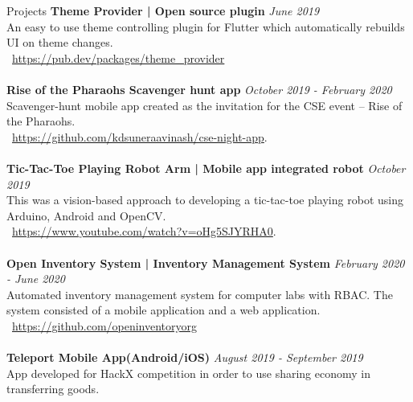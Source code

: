 \documentclass{cv}
\begin{document}
\begin{adjustwidth}{55pt}{0pt}
\begin{rSection}{Projects}
{\bf Theme Provider | Open source plugin}                        \hfill {\em June 2019} 
\\An easy to use theme controlling plugin for Flutter which automatically rebuilds UI on theme changes. \\
\faPlug\ \url{https://pub.dev/packages/theme\_provider} \\
\\{\bf Rise of the Pharaohs Scavenger hunt app}                 \hfill {\em October 2019 - February 2020} 
\\Scavenger-hunt mobile app created as the invitation for the CSE event – Rise of the Pharaohs.\\
\faGithub*\ \url{https://github.com/kdsuneraavinash/cse-night-app}. \\
\\{\bf Tic-Tac-Toe Playing Robot Arm | Mobile app integrated robot}     \hfill {\em October 2019}
\\This was a vision-based approach to developing a tic-tac-toe playing robot using Arduino, Android and OpenCV.\\
\faYoutube\ \url{https://www.youtube.com/watch?v=oHg5SJYRHA0}. \\
\\{\bf Open Inventory System | Inventory Management System}     \hfill {\em February 2020 - June 2020} 
\\Automated inventory management system for computer labs with RBAC. The system consisted of a mobile application and a web application.\\
\faGithub\ \url{https://github.com/openinventoryorg} \\
\\{\bf Teleport Mobile App(Android/iOS)}                        \hfill {\em August 2019 - September 2019} 
\\App developed for HackX competition in order to use sharing economy in transferring goods. 
\end{rSection}

\end{adjustwidth}
\end{document}

